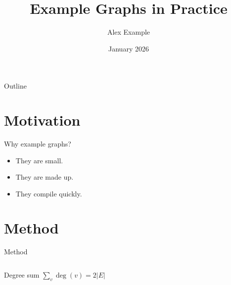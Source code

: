 \documentclass{beamer}
\title{Example Graphs in Practice}
\author{Alex Example}
\institute{Example University}
\date{January 2026}
\begin{document}
\begin{frame}
  \titlepage
\end{frame}

\begin{frame}{Outline}
  \tableofcontents
\end{frame}

\section{Motivation}
\begin{frame}{Why example graphs?}
  \begin{itemize}
    \item<1-> They are small.
    \item<2-> They are made up.
    \item<3-> They compile quickly.
  \end{itemize}
\end{frame}

\section{Method}
\begin{frame}{Method}
  \begin{columns}
    \begin{block}{Degree sum}
      $\sum_{v} \deg(v) = 2|E|$
    \end{block}
  \end{columns}
\end{frame}
\end{document}
